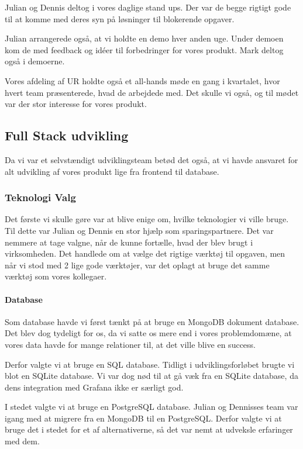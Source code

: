 \documentclass[a4paper]{article}
\begin{document}
Julian og Dennis deltog i vores daglige stand ups.
Der var de begge rigtigt gode til at komme med deres syn på løsninger til blokerende opgaver.

Julian arrangerede også, at vi holdte en demo hver anden uge.
Under demoen kom de med feedback og idéer til forbedringer for vores produkt.
Mark deltog også i demoerne.

Vores afdeling af UR holdte også et all-hands møde en gang i kvartalet,
hvor hvert team præsenterede, hvad de arbejdede med.
Det skulle vi også,
og til mødet var der stor interesse for vores produkt.

\subsection{Full Stack udvikling}
Da vi var et selvstændigt udviklingsteam betød det også,
at vi havde ansvaret for alt udvikling af vores produkt
lige fra frontend til database.

\subsubsection{Teknologi Valg}
\label{teknologi_valg}
Det første vi skulle gøre var at blive enige om,
hvilke teknologier vi ville bruge.
Til dette var Julian og Dennis en stor hjælp som sparingspartnere.
Det var nemmere at tage valgne,
når de kunne fortælle,
hvad der blev brugt i virksomheden.
Det handlede om at vælge det rigtige værktøj til opgaven,
men når vi stod med 2 lige gode værktøjer,
var det oplagt at bruge det samme værktøj som vores kollegaer.

\paragraph{Database}
Som database havde vi først tænkt på at bruge en MongoDB dokument database.
Det blev dog tydeligt for os, da vi satte os mere end i vores problemdomæne,
at vores data havde for mange relationer til, at det ville blive en success.

Derfor valgte vi at bruge en SQL database.
Tidligt i udviklingsforløbet brugte vi blot en SQLite database.
Vi var dog nød til at gå væk fra en SQLite database,
da dens integration med Grafana ikke er særligt god.

I stedet valgte vi at bruge en PostgreSQL database.
Julian og Dennisses team var igang med at migrere fra en MongoDB til en PostgreSQL.
Derfor valgte vi at bruge det i stedet for et af alternativerne,
så det var nemt at udveksle erfaringer med dem.
\end{document}
